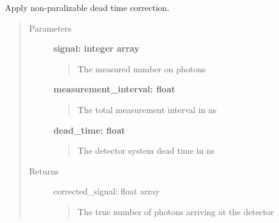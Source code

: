 \documentclass[letterpaper,10pt,english]{sphinxmanual}
\begin{document}
\begin{fulllineitems}
\label{pre_processing:pre_processing.correct_dead_time_nonparalyzable}
Apply non-paralizable dead time correction.
\begin{quote}\begin{description}
\item[{Parameters}] \leavevmode
\textbf{signal: integer array}
\begin{quote}

The measured number on photons
\end{quote}

\textbf{measurement\_interval: float}
\begin{quote}

The total measurement interval in ns
\end{quote}

\textbf{dead\_time: float}
\begin{quote}

The detector system dead time in ns
\end{quote}

\item[{Returns}] \leavevmode
corrected\_signal: float array
\begin{quote}

The true number of photons arriving at the detector
\end{quote}

\end{description}\end{quote}

\end{fulllineitems}

\end{document}
